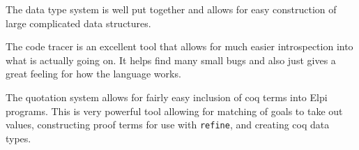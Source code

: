 \documentclass[thesis.tex]{subfiles}
\begin{document}
The data type system is well put together and allows for easy construction of large complicated data structures.

The code tracer is an excellent tool that allows for much easier introspection into what is actually going on. It helps find many small bugs and also just gives a great feeling for how the language works.

The quotation system allows for fairly easy inclusion of coq terms into Elpi programs. This is very powerful tool allowing for matching of goals to take out values, constructing proof terms for use with \texttt{refine}, and creating coq data types.
\end{document}
